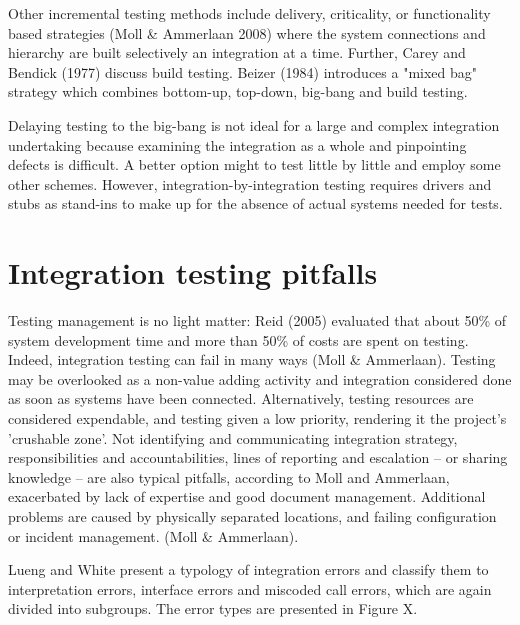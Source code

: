 \documentclass[12pt,a4paper,oneside,pdftex]{report}
\begin{document}
Other incremental testing methods include delivery, criticality, or functionality based 
strategies (Moll \& Ammerlaan 2008) where the system connections and hierarchy are built selectively an integration at a time. Further, Carey and Bendick (1977) discuss build testing. Beizer (1984) introduces a "mixed bag" strategy which combines bottom-up, top-down, big-bang and build testing. 

Delaying testing to the big-bang is not ideal for a large and complex integration undertaking because examining the integration as a whole and pinpointing defects is difficult. A better option might to test little by little and employ some other schemes. However, integration-by-integration testing requires drivers and stubs as stand-ins to make up for the absence of actual systems needed for tests.

\section{Integration testing pitfalls}

Testing management is no light matter: Reid (2005) evaluated that about 50\% of system development time and more than 50\% of costs are spent on testing. Indeed, integration testing can fail in many ways (Moll \& Ammerlaan). Testing may be overlooked as a non-value adding activity and integration considered done as soon as systems have been connected. Alternatively, testing resources are considered expendable, and testing given a low priority, rendering it the project's 'crushable zone'. Not identifying and communicating integration strategy, responsibilities and accountabilities, lines of reporting and escalation -- or sharing knowledge -- are also typical pitfalls, according to Moll and Ammerlaan, exacerbated by lack of expertise and good document management. Additional problems are caused by physically separated locations, and failing configuration or incident management. (Moll \& Ammerlaan).

Lueng and White present a typology of integration errors and classify them to interpretation errors, interface errors and miscoded call errors, which are again divided into subgroups. The error types are presented in Figure X.
\end{document}
